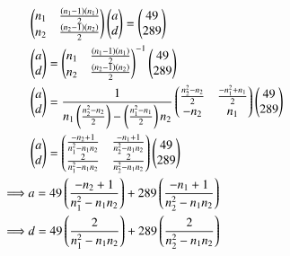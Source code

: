 \documentclass[journal,12pt,twocolumn]{IEEEtran}
\theoremstyle{remark}
\begin{document}
\begin{align}
    &\begin{pmatrix}
        n_1&\frac{\brak{n_1-1}\brak{n_1}}{2}\\
        n_2&\frac{\brak{n_2-1}\brak{n_2}}{2}
    \end{pmatrix}
    \begin{pmatrix}
        a\\
        d
    \end{pmatrix}
    =
    \begin{pmatrix}
        49\\
        289
    \end{pmatrix}
    \\
    &\begin{pmatrix}
        a\\
        d
    \end{pmatrix}
    =
    \begin{pmatrix}
        n_1&\frac{\brak{n_1-1}\brak{n_1}}{2}\\
        n_2&\frac{\brak{n_2-1}\brak{n_2}}{2}
    \end{pmatrix}^{-1}
    \begin{pmatrix}
        49\\
        289
    \end{pmatrix}
    \\
    &\begin{pmatrix}
        a\\
        d
    \end{pmatrix}
    =
    \frac{1}{n_1\brak{\frac{n_2^2-n_2}{2}}-\brak{\frac{n_1^2-n_1}{2}}n_2}
    \begin{pmatrix}
        \frac{n_2^2-n_2}{2} & \frac{-n_1^2+n_1}{2} \\
        -n_2 & n_1
    \end{pmatrix}
    \begin{pmatrix}
        49\\
        289
    \end{pmatrix}
    \\
    &\begin{pmatrix}
        a\\
        d
    \end{pmatrix}
    =
    \begin{pmatrix}
        \frac{-n_2+1}{n_1^2-n_1n_2} & \frac{-n_1+1}{n_2^2-n_1n_2} \\
        \frac{2}{n_1^2-n_1n_2} & \frac{2}{n_2^2-n_1n_2}
    \end{pmatrix}
    \begin{pmatrix}
        49\\
        289
    \end{pmatrix}
    \\
    \vspace{0.2cm}
    \implies &a=49\brak{\frac{-n_2+1}{n_1^2-n_1n_2}}+289\brak{\frac{-n_1+1}{n_2^2-n_1n_2}}\\
    \implies &d=49\brak{\frac{2}{n_1^2-n_1n_2}}+289\brak{\frac{2}{n_2^2-n_1n_2}}
\end{align}
\end{document}
